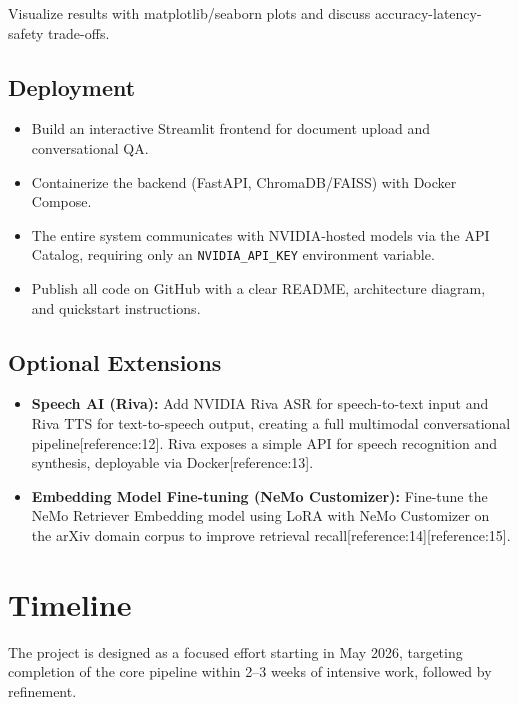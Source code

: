 \documentclass[a4paper,11pt]{article}
\begin{document}
Visualize results with matplotlib/seaborn plots and discuss accuracy-latency-safety trade-offs.

\subsection{Deployment}
\begin{itemize}[noitemsep]
    \item Build an interactive Streamlit frontend for document upload and conversational QA.
    \item Containerize the backend (FastAPI, ChromaDB/FAISS) with Docker Compose.
    \item The entire system communicates with NVIDIA-hosted models via the API Catalog, requiring only an \texttt{NVIDIA\_API\_KEY} environment variable.
    \item Publish all code on GitHub with a clear README, architecture diagram, and quickstart instructions.
\end{itemize}

\subsection{Optional Extensions}
\begin{itemize}[noitemsep]
    \item \textbf{Speech AI (Riva):} Add NVIDIA Riva ASR for speech-to-text input and Riva TTS for text-to-speech output, creating a full multimodal conversational pipeline[reference:12]. Riva exposes a simple API for speech recognition and synthesis, deployable via Docker[reference:13].
    \item \textbf{Embedding Model Fine-tuning (NeMo Customizer):} Fine-tune the NeMo Retriever Embedding model using LoRA with NeMo Customizer on the arXiv domain corpus to improve retrieval recall[reference:14][reference:15].
\end{itemize}

\section{Timeline}
The project is designed as a focused effort starting in May 2026, targeting completion of the core pipeline within 2--3 weeks of intensive work, followed by refinement.
\end{document}
